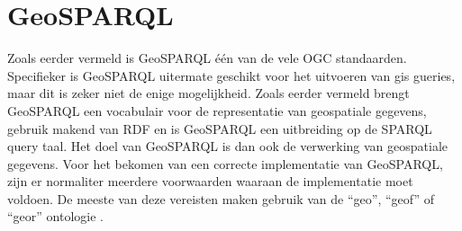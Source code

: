\section{GeoSPARQL}
\label{sec:geosparql}

Zoals eerder vermeld is GeoSPARQL één van de vele OGC standaarden. Specifieker is GeoSPARQL uitermate geschikt voor het uitvoeren van \acrshort{gis} gueries, maar dit is zeker niet de enige mogelijkheid. Zoals eerder vermeld brengt GeoSPARQL een vocabulair voor de representatie van geospatiale gegevens, gebruik makend van RDF en is GeoSPARQL een uitbreiding op de SPARQL query taal. Het doel van GeoSPARQL is dan ook de verwerking van geospatiale gegevens. Voor het bekomen van een correcte implementatie van GeoSPARQL, zijn er normaliter meerdere voorwaarden waaraan de implementatie moet voldoen. De meeste van deze vereisten maken gebruik van de ``geo'', ``geof'' of ``geor'' ontologie \cite{ogcdocs}.


